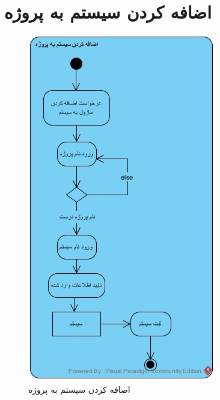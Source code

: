 \section{اضافه کردن سیستم به پروژه}
\begin{figure}[H]
	\centering
	\includegraphics[scale=0.8]{img/activity/addsys}
	\caption{اضافه کردن سیستم به پروژه}
\end{figure}

